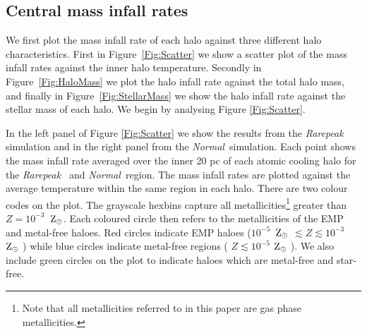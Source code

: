 \documentclass[graphics, twocolumn, usenatbib]{mn2e}
\newcommand{\zsolar} {$\rm{Z_{\odot}}~$}
\newcommand{\zsolarc} {$\rm{Z_{\odot}}$}
\newcommand{\rarepeak} {\textit{Rarepeak~}}
\newcommand{\normal} {\textit{Normal~}}
\begin{document}
\subsection{Central mass infall rates}

\indent We first plot the mass infall rate of each halo against three different halo
characteristics. First in Figure~\ref{Fig:Scatter} we show a scatter plot of the mass infall rates
against the inner halo temperature. Secondly in Figure~\ref{Fig:HaloMass} we plot the halo infall
rate against the total halo mass, and finally in Figure~\ref{Fig:StellarMass} we show the halo
infall rate against the stellar mass of each halo. We begin by analysing Figure \ref{Fig:Scatter}. 

In the left panel of Figure \ref{Fig:Scatter} we show the results from the \rarepeak
simulation and in the right panel from the \normal simulation. Each point shows the mass
infall rate averaged over the inner 20 pc of each atomic cooling halo for the \rarepeak
and \normal region. The mass infall rates are plotted against the average temperature within
the same region in each halo. There are two colour codes on the plot. The grayscale
hexbins capture all metallicities\footnote{Note that all metallicities
  referred to in this paper are gas phase metallicities.}
greater than $Z = 10^{-3}$~\zsolarc. Each coloured circle then refers to
the metallicities of the 
EMP and metal-free haloes. Red circles indicate EMP haloes
 ($10^{-5}$~\zsolar $ \lesssim Z \lesssim 10^{-3}$~\zsolar )
while blue circles indicate metal-free regions  ( $Z \lesssim 10^{-5}$ \zsolar ). We also
include green circles on the plot to indicate haloes which are metal-free and star-free. 
\end{document}
